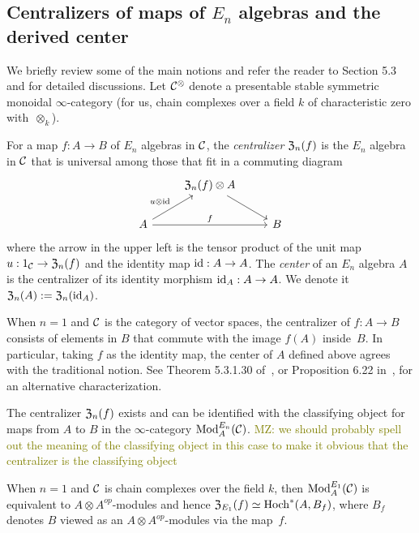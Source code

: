 \documentclass[11pt]{amsart}
\numberwithin{equation}{section}
\def\mahmoud{\textcolor{olive}{MZ: }\textcolor{olive}}
\begin{document}
\subsection{Centralizers of maps of $E_n$ algebras and the derived center}
\label{sec: centralizer}

We briefly review some of the main notions and refer the reader to \cite{LurieHA} Section 5.3 and \cite{FrancisHH} for detailed discussions. Let $\mathcal C^\otimes$ denote a presentable stable symmetric monoidal $\infty$-category (for us, chain complexes over a field $k$ of characteristic zero with~$\otimes_k$).

\begin{dfn}\label{D:centralizer}
For a map $f: A \to B$ of $E_n$ algebras in $\mathcal C$, 
the {\em centralizer} ${\frak Z}_n(f)$ is the $E_n$ algebra in $\mathcal C$ that is universal among those that fit in a commuting diagram
\[
\begin{tikzcd}
& {\frak Z}_n(f) \otimes A \arrow[dr] & \\
A \arrow[ur, "u \otimes \id"] \arrow[rr, "f"] && B
\end{tikzcd}
\]
where the arrow in the upper left is the tensor product of the unit map $u: 1_\mathcal C \to {\frak Z}_n(f)$ and the identity map ${\rm id}: A \to A$.
The {\em center} of an $E_n$ algebra $A$ is the centralizer of its identity morphism ${\rm id}_A: A \to A$. 
We  denote it ${\frak Z}_n(A) := {\frak Z}_n({\rm id}_A)$.
\end{dfn}

When $n=1$ and $\mathcal C$ is the category of vector spaces, 
the centralizer of $f: A \to B$ consists of elements in $B$ that commute with the image $f(A)$ inside~$B$. 
In particular, taking $f$ as the identity map, 
the center of $A$ defined above agrees with the traditional notion. 
See Theorem 5.3.1.30 of~\cite{LurieHA}, or Proposition 6.22 in~\cite{GTZ3}, for an alternative characterization.

\begin{prp}
\label{T:centralizer=inthom} 
The centralizer ${\frak Z}_n(f)$ exists and can be identified with the classifying object for maps from $A$ to $B$ in the $\infty$-category ${\rm Mod}^{E_n}_A(\mathcal C)$. \mahmoud{we should probably spell out the meaning of the classifying object in this case to make it obvious that the centralizer is the classifying object}
\end{prp} 

When $n=1$ and $\mathcal C$ is chain complexes over the field $k$, then ${\rm Mod}^{E_1}_A(\mathcal C)$ is equivalent to $A\otimes A^{op}$-modules and hence ${\frak Z}_{E_1}(f) \simeq {\rm Hoch}^*(A,B_f)$,
where $B_f$ denotes $B$ viewed as an $A\otimes A^{op}$-modules via the map~$f$.
\end{document}
